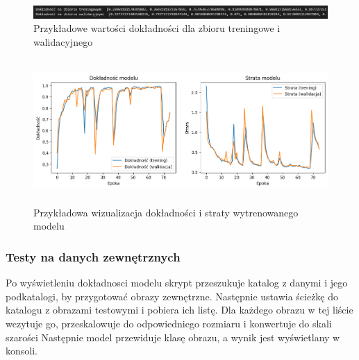 \begin{figure}[ht]
	\centering
	\includegraphics[width=15cm]{resources/model/images/scr-standard-result.png}
	\caption{Przykładowe wartości dokładności dla zbioru treningowe i walidacyjnego}
	\label{Fig:tests-wyniki-2}
\end{figure}
\FloatBarrier

\begin{figure}[ht]
	\centering
	\includegraphics[height=5.5cm]{resources/model/images/v2_epoch75.png}
	\caption{Przykładowa wizualizacja dokładności i straty wytrenowanego modelu}
	\label{Fig:tests-wyniki-1}
\end{figure}
\FloatBarrier

\subsubsection{Testy na danych zewnętrznych}
Po wyświetleniu dokładnosci modelu skrypt przeszukuje katalog z danymi i jego podkatalogi, by przygotować obrazy zewnętrzne.
Następnie ustawia ścieżkę do katalogu z obrazami testowymi i pobiera ich listę.
Dla każdego obrazu w tej liście wczytuje go, przeskalowuje do odpowiedniego rozmiaru i konwertuje do skali szarości
Następnie model przewiduje klasę obrazu, a wynik jest wyświetlany w konsoli.